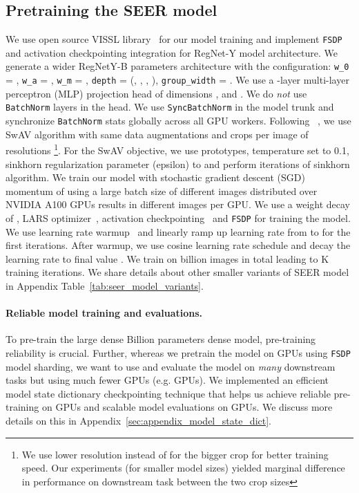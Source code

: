 \documentclass[10pt,twocolumn,letterpaper]{article}
\newcommand{\regnet}{RegNet\xspace}
\newcommand{\swav}{SwAV\xspace}
\newcommand{\syncbn}{\texttt{SyncBatchNorm}\xspace}
\newcommand{\batchnorm}{\texttt{BatchNorm}\xspace}
\begin{document}
\subsection{Pretraining the SEER model}
We use open source VISSL library~\cite{goyal2021vissl} for our model training and implement \texttt{FSDP} and activation checkpointing integration for \regnet-Y model architecture. We generate a wider RegNetY-B parameters architecture with the configuration: \texttt{w\_0} = , \texttt{w\_a} = , \texttt{w\_m} = , \texttt{depth} = (, , , ), \texttt{group\_width} = . We use a -layer multi-layer perceptron (MLP) projection head of dimensions ,  and . We do \textit{not} use \texttt{BatchNorm} layers in the head. We use \syncbn in the model trunk and synchronize \batchnorm stats globally across all GPU workers. Following ~\cite{goyal2021self}, we use \swav algorithm with same data augmentations and  crops per image of resolutions \footnote{We use lower resolution  instead of  for the bigger crop for better training speed. Our experiments (for smaller model sizes) yielded marginal difference in performance on downstream task between the two crop sizes}. For the SwAV objective, we use  prototypes, temperature  set to 0.1, sinkhorn regularization parameter (epsilon) to  and perform  iterations of sinkhorn algorithm. We train our model with stochastic gradient descent (SGD) momentum of  using a large batch size of  different images distributed over  NVIDIA A100 GPUs results in  different images per GPU. We use a weight decay of , LARS optimizer~\cite{you2017large}, activation checkpointing~\cite{activationchen2016training} and \texttt{FSDP} for training the model. We use learning rate warmup~\cite{goyal2017accurate} and linearly ramp up learning rate from  to  for the first  iterations. After warmup, we use cosine learning rate schedule and decay the learning rate to final value . We train on  billion images in total leading to K training iterations. We share details about other smaller variants of SEER model in Appendix Table~\ref{tab:seer_model_variants}.

\paragraph{Reliable model training and evaluations.} To pre-train the large dense Billion parameters dense model, pre-training reliability is crucial. Further, whereas we pretrain the model on  GPUs using \texttt{FSDP} model sharding, we want to use and evaluate the model on \textit{many} downstream tasks but using much fewer GPUs (e.g.  GPUs). We implemented an efficient model state dictionary checkpointing technique that helps us achieve reliable pre-training on  GPUs and scalable model evaluations on  GPUs. We discuss more details on this in Appendix~\ref{sec:appendix_model_state_dict}.
\end{document}
